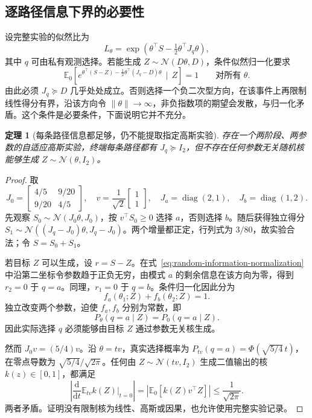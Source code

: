 \documentclass[UTF8,fontset=fandol,11pt,a4paper]{ctexart}
\newcommand{\N}{\mathcal N}
\newcommand{\E}{\mathbb E}
\newcommand{\diag}{\operatorname{diag}}
\newcommand{\given}{\,\mid\,}
\newcommand{\dd}{\mathrm d}
\newtheorem{theorem}{定理}[section]
\theoremstyle{definition}
\theoremstyle{remark}
\numberwithin{equation}{section}
\begin{document}
\subsection{逐路径信息下界的必要性}
设完整实验的似然比为
\begin{equation}
 L_\theta=\exp(\theta^\top S-\tfrac12\theta^\top J_q\theta),
\end{equation}
其中 $q$ 可由私有观测选择。若能生成 $Z\sim\N(D\theta,D)$，条件似然归一化要求
\begin{equation}
 \E_0\!\left[
 e^{\theta^\top(S-Z)-\frac12\theta^\top(J_q-D)\theta}\given Z
 \right]=1\qquad\text{对所有 }\theta.
 \label{eq:random-information-normalization}
\end{equation}
由此必须 $J_q\succeq D$ 几乎处处成立。否则选择一个负二次型方向，在该事件上再限制线性得分有界，沿该方向令 $\|\theta\|\to\infty$，非负指数项的期望会发散，与归一化矛盾。这个条件是必要条件，下面说明它并不充分。

\begin{theorem}[每条路径信息都足够，仍不能提取指定高斯实验]
\label{thm:matrix-no-go}
存在一个两阶段、两参数的自适应高斯实验，终端每条路径都有 $J_q\succeq I_2$，但不存在任何参数无关随机核能够生成 $Z\sim\N(\theta,I_2)$。
\end{theorem}

\begin{proof}
取
\begin{equation}
 J_0=\begin{bmatrix}4/5&9/20\\9/20&4/5\end{bmatrix},\quad
 v=\frac1{\sqrt2}\begin{bmatrix}1\\1\end{bmatrix},\quad
 J_a=\diag(2,1),\quad J_b=\diag(1,2).
 \label{eq:matrix-counterexample}
\end{equation}
先观察 $S_0\sim\N(J_0\theta,J_0)$，按 $v^\top S_0\ge0$ 选择 $a$，否则选择 $b$。随后获得独立得分 $S_1\sim\N((J_q-J_0)\theta,J_q-J_0)$。两个增量都正定，行列式为 $3/80$，故实验合法；令 $S=S_0+S_1$。

若目标 $Z$ 可以生成，设 $r=S-Z$。在式~\eqref{eq:random-information-normalization} 中沿第二坐标令参数趋于正负无穷，由模式 $a$ 的剩余信息在该方向为零，得到 $r_2=0$ 于 $q=a$。同理，$r_1=0$ 于 $q=b$。条件归一化因此分为
\[
 f_a(\theta_1;Z)+f_b(\theta_2;Z)=1.
\]
独立改变两个参数，迫使 $f_a,f_b$ 分别为常数，即
\begin{equation}
 P_\theta(q=a\mid Z)=P_0(q=a\mid Z).
 \label{eq:selector-garble}
\end{equation}
因此实际选择 $q$ 必须能够由目标 $Z$ 通过参数无关核生成。

然而 $J_0v=(5/4)v$。沿 $\theta=t v$，真实选择概率为
$P_{tv}(q=a)=\Phi(\sqrt{5/4}\,t)$，在零点导数为 $\sqrt{5/4}/\sqrt{2\pi}$。任何由 $Z\sim\N(tv,I_2)$ 生成二值输出的核 $k(z)\in[0,1]$，都满足
\[
 \left|\frac{\dd}{\dd t}\E_{tv}k(Z)\bigg|_{t=0}\right|
 =|\E_0[k(Z)v^\top Z]|
 \le\frac1{\sqrt{2\pi}}.
\]
两者矛盾。证明没有限制核为线性、高斯或因果，也允许使用完整实验记录。
\end{proof}
\end{document}
